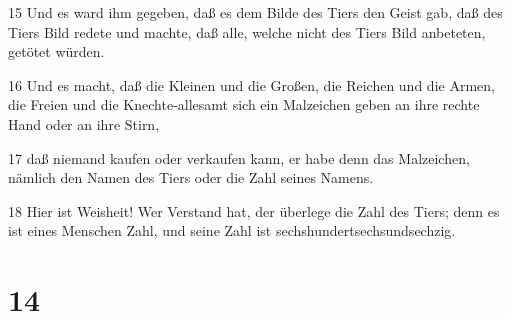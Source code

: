 \par 15 Und es ward ihm gegeben, daß es dem Bilde des Tiers den Geist gab, daß des Tiers Bild redete und machte, daß alle, welche nicht des Tiers Bild anbeteten, getötet würden.
\par 16 Und es macht, daß die Kleinen und die Großen, die Reichen und die Armen, die Freien und die Knechte-allesamt sich ein Malzeichen geben an ihre rechte Hand oder an ihre Stirn,
\par 17 daß niemand kaufen oder verkaufen kann, er habe denn das Malzeichen, nämlich den Namen des Tiers oder die Zahl seines Namens.
\par 18 Hier ist Weisheit! Wer Verstand hat, der überlege die Zahl des Tiers; denn es ist eines Menschen Zahl, und seine Zahl ist sechshundertsechsundsechzig.

\chapter{14}

